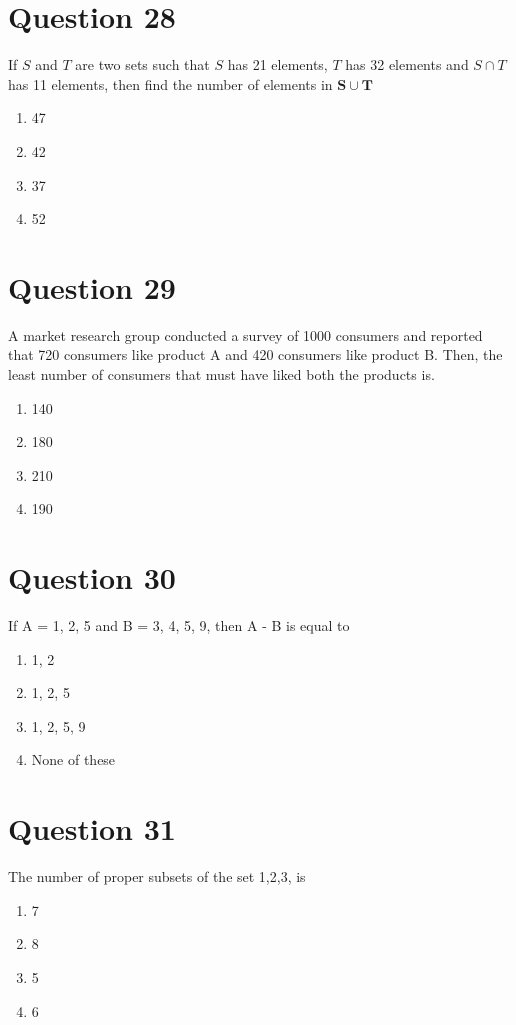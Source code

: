 \documentclass{article}
\begin{document}
\section*{Question 28}
If \(S\) and \(T\) are two sets such that \(S\) has 21 elements, \(T\) has 32 elements and \(S \cap T\) has 11 elements, then find the number of elements in \(\boldsymbol{S} \cup \boldsymbol{T}\)\newline
\begin{enumerate}[label=(\alph*)]
\item 47
\item 42
\item 37
\item 52
\end{enumerate}
\newpage
\section*{Question 29}
A market research group conducted a survey of 1000 consumers and reported that 720 consumers like product A and 420 consumers like product B. Then, the least number of consumers that must have liked both the products is.\newline
\begin{enumerate}[label=(\alph*)]
\item 140
\item 180
\item 210
\item 190
\end{enumerate}
\newpage
\section*{Question 30}
If A = {1, 2, 5} and B = {3, 4, 5, 9}, then A - B is equal to\newline
\begin{enumerate}[label=(\alph*)]
\item {1, 2}
\item {1, 2, 5}
\item {1, 2, 5, 9}
\item None of these\newline
\end{enumerate}
\newpage
\section*{Question 31}
The number of proper subsets of the set {1,2,3,} is\newline
\begin{enumerate}[label=(\alph*)]
\item 7
\item 8
\item 5
\item 6
\end{enumerate}
\newpage
\end{document}
